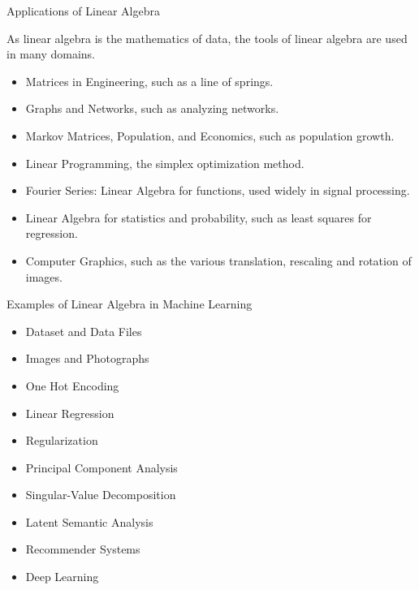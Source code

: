 \documentclass{beamer}
\begin{document}
\begin{frame}{Applications of Linear Algebra}
	\begin{flushleft}
		As linear algebra is the mathematics of data, the tools of linear algebra are used in many domains.
	\end{flushleft}
\vspace{-10pt}
	\begin{itemize}
		\item Matrices in Engineering, such as a line of springs.
		\item Graphs and Networks, such as analyzing networks.
		\item Markov Matrices, Population, and Economics, such as population growth.
		\item Linear Programming, the simplex optimization method.
		\item Fourier Series: Linear Algebra for functions, used widely in signal processing.
		\item Linear Algebra for statistics and probability, such as least squares for regression.
		\item Computer Graphics, such as the various translation, rescaling and rotation of images.
	\end{itemize}
\end{frame}
\begin{frame}{Examples of Linear Algebra in Machine Learning}
   \begin{itemize}
		\item Dataset and Data Files
		\item Images and Photographs
		\item One Hot Encoding
		\item Linear Regression
		\item Regularization
		\item Principal Component Analysis
		\item Singular-Value Decomposition
		\item Latent Semantic Analysis
		\item Recommender Systems
		\item Deep Learning
\end{itemize}
\end{frame}
\end{document}

